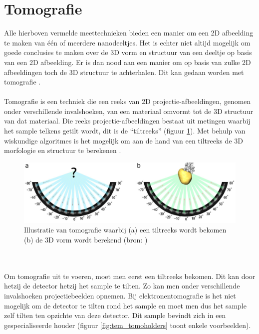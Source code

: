 \documentclass{report}
\begin{document}
\section{Tomografie} \label{ch:tomo}
Alle hierboven vermelde meettechnieken bieden een manier om een 2D afbeelding te maken van één of meerdere nanodeeltjes. Het is echter niet altijd mogelijk om goede conclusies te maken over de 3D vorm en structuur van een deeltje op basis van een 2D afbeelding. Er is dan nood aan een manier om op basis van zulke 2D afbeeldingen toch de 3D structuur te achterhalen. Dit kan gedaan worden met tomografie \cite{paper:art, paper:sirt, paper:em}.
\\ \\
Tomografie is een techniek die een reeks van 2D projectie-afbeeldingen, genomen onder verschillende invalshoeken, van een materiaal omvormt tot de 3D structuur van dat materiaal. Die reeks projectie-afbeeldingen bestaat uit metingen waarbij het sample telkens getilt wordt, dit is de ``tiltreeks'' (figuur \ref{fig:tem_tomography}). Met behulp van wiskundige algoritmes is het mogelijk om aan de hand van een tiltreeks de 3D morfologie en structuur te berekenen \cite{paper:radon, review:electrontomography}.
\begin{figure}[h!]
	\centering
	\includegraphics[width=12cm]{images/tem/tomography.png}
	\caption{Illustratie van tomografie waarbij (a) een tiltreeks wordt bekomen (b) de 3D vorm wordt berekend (bron: \cite{thesis:zanaga})}
	\label{fig:tem_tomography}
\end{figure}
\\ \\
Om tomografie uit te voeren, moet men eerst een tiltreeks bekomen. Dit kan door hetzij de detector hetzij het sample te tilten. Zo kan men onder verschillende invalshoeken projectiebeelden opnemen. Bij elektronentomografie is het niet mogelijk om de detector te tilten rond het sample en moet men dus het sample zelf tilten ten opzichte van deze detector. Dit sample bevindt zich in een gespecialiseerde houder (figuur \ref{fig:tem_tomoholders} toont enkele voorbeelden). 
\end{document}
